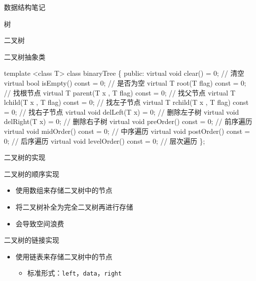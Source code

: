 \documentclass[
  ignorenonframetext,
]{beamer}
\newenvironment{Shaded}{}{}
\newcommand{\NormalTok}[1]{#1}
\providecommand{\tightlist}{%
  \setlength{\itemsep}{0pt}\setlength{\parskip}{0pt}}
\begin{document}
\begin{frame}[fragile]{数据结构笔记}
\begin{block}{树}
\begin{block}{二叉树}
\begin{block}{二叉树抽象类}
\protect{}\label{ux4e8cux53c9ux6811ux62bdux8c61ux7c7b}
\begin{Shaded}
\begin{Highlighting}[]
\NormalTok{template \textless{}class T\textgreater{}}
\NormalTok{class binaryTree}
\NormalTok{\{}
\NormalTok{  public:}
\NormalTok{    virtual void clear() = 0;                     // 清空}
\NormalTok{    virtual bool isEmpty() const = 0;             // 是否为空}
\NormalTok{    virtual T root(T flag) const = 0;             // 找根节点}
\NormalTok{    virtual T parent(T x , T flag) const = 0;     // 找父节点}
\NormalTok{    virtual T lchild(T x , T flag) const = 0;     // 找左子节点}
\NormalTok{    virtual T rchild(T x , T flag) const = 0;     // 找右子节点}
\NormalTok{    virtual void delLeft(T x) = 0;                // 删除左子树}
\NormalTok{    virtual void delRight(T x) = 0;               // 删除右子树}
\NormalTok{    virtual void preOrder() const = 0;            // 前序遍历}
\NormalTok{    virtual void midOrder() const = 0;            // 中序遍历}
\NormalTok{    virtual void postOrder() const = 0;           // 后序遍历}
\NormalTok{    virtual void levelOrder() const = 0;          // 层次遍历}
\NormalTok{\};}
\end{Highlighting}
\end{Shaded}
\end{block}

\begin{block}{二叉树的实现}
\protect{}\label{ux4e8cux53c9ux6811ux7684ux5b9eux73b0}
\begin{block}{二叉树的顺序实现}
\protect{}\label{ux4e8cux53c9ux6811ux7684ux987aux5e8fux5b9eux73b0}
\begin{itemize}
\tightlist
\item
  使用数组来存储二叉树中的节点
\item
  将二叉树补全为完全二叉树再进行存储
\item
  会导致空间浪费
\end{itemize}

\end{block}

\begin{block}{二叉树的链接实现}
\protect{}\label{ux4e8cux53c9ux6811ux7684ux94feux63a5ux5b9eux73b0}
\begin{itemize}
\tightlist
\item
  使用链表来存储二叉树中的节点

  \begin{itemize}
  \tightlist
  \item
    标准形式：\texttt{left}，\texttt{data}，\texttt{right}
  \end{itemize}
\end{itemize}



\end{block}
\end{block}
\end{block}
\end{block}
\end{frame}
\end{document}
